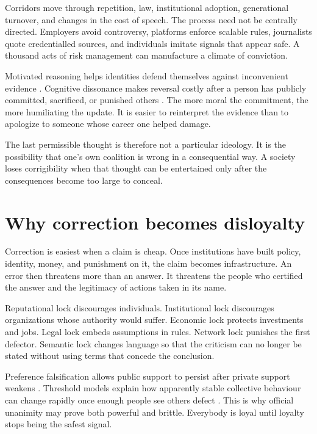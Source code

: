 \documentclass[12pt,a4paper]{book}
\begin{document}
Corridors move through repetition, law, institutional adoption, generational
turnover, and changes in the cost of speech.  The process need not be centrally
directed.  Employers avoid controversy, platforms enforce scalable rules,
journalists quote credentialled sources, and individuals imitate signals that
appear safe.  A thousand acts of risk management can manufacture a climate of
conviction.

Motivated reasoning helps identities defend themselves against inconvenient
evidence \cite{Kunda1990}.  Cognitive dissonance makes reversal costly after a
person has publicly committed, sacrificed, or punished others
\cite{Festinger1957}.  The more moral the commitment, the more humiliating the
update.  It is easier to reinterpret the evidence than to apologize to someone
whose career one helped damage.

The last permissible thought is therefore not a particular ideology.  It is
the possibility that one's own coalition is wrong in a consequential way.  A
society loses corrigibility when that thought can be entertained only after
the consequences become too large to conceal.

\section{Why correction becomes disloyalty}

Correction is easiest when a claim is cheap.  Once institutions have built
policy, identity, money, and punishment on it, the claim becomes infrastructure.
An error then threatens more than an answer.  It threatens the people who
certified the answer and the legitimacy of actions taken in its name.

Reputational lock discourages individuals.  Institutional lock discourages
organizations whose authority would suffer.  Economic lock protects investments
and jobs.  Legal lock embeds assumptions in rules.  Network lock punishes the
first defector.  Semantic lock changes language so that the criticism can no
longer be stated without using terms that concede the conclusion.

Preference falsification allows public support to persist after private support
weakens \cite{Kuran1995}.  Threshold models explain how apparently stable
collective behaviour can change rapidly once enough people see others defect
\cite{Granovetter1978}.  This is why official unanimity may prove both powerful
and brittle.  Everybody is loyal until loyalty stops being the safest signal.
\end{document}
